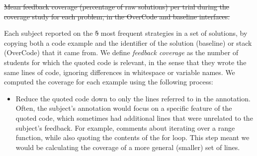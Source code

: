 \documentclass[12pt,twoside]{mitthesis}
\providecommand{\DIFaddtex}[1]{{\protect\color{blue}\uwave{#1}}} %
\providecommand{\DIFdeltex}[1]{{\protect\color{red}\sout{#1}}}                      %
\providecommand{\DIFaddbegin}{} %
\providecommand{\DIFaddend}{} %
\providecommand{\DIFdelbegin}{} %
\providecommand{\DIFdelend}{} %
\providecommand{\DIFdelFL}[1]{\DIFdel{#1}} %
\providecommand{\DIFadd}[1]{\texorpdfstring{\DIFaddtex{#1}}{#1}} %
\providecommand{\DIFdel}[1]{\texorpdfstring{\DIFdeltex{#1}}{}} %
\begin{document}
{{{{{{{{{{\DIFdelbegin %
\DIFdelend %

\DIFdelbegin %
{%
\DIFdelFL{Mean feedback coverage (percentage of raw solutions) per trial during the coverage study for each problem, in the OverCode and baseline interfaces.}}

\DIFdelend \DIFaddbegin {\bf \DIFadd{H3: Feedback coverage}} \DIFaddend Each subject reported on the \DIFdelbegin \DIFdel{5 }\DIFdelend \DIFaddbegin \DIFadd{five }\DIFaddend most frequent strategies in a set of solutions, by copying both a code example and the identifier of the solution (baseline) or stack (OverCode) that it came from. We define \emph{feedback coverage} as the number of students for which the quoted code is relevant, in the sense that they wrote the same lines of code, ignoring differences in whitespace or variable names. We computed the coverage for each example using the following process:
 \begin{itemize} 
\item Reduce the quoted code down to only the lines referred to in the annotation. Often, the subject's annotation would focus on a specific feature of the quoted code, which sometimes had additional lines that were unrelated to the subject's feedback. For example, comments about iterating over a range function, while also quoting the contents of the for loop. This step meant we would be calculating the coverage of a more general (smaller) set of lines.


\end{itemize}}}}}}}}}}}
\end{document}
